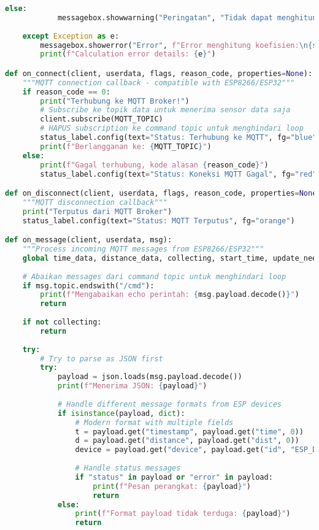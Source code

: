 \begin{itemize}
\begin{scriptsize}
\begin{lstlisting}[language=python]
        else:
            messagebox.showwarning("Peringatan", "Tidak dapat menghitung koefisien\nTidak ditemukan pasangan pantulan yang valid")
            
    except Exception as e:
        messagebox.showerror("Error", f"Error menghitung koefisien:\n{str(e)}\n\nSilakan periksa data dan pengaturan Anda")
        print(f"Calculation error details: {e}")

def on_connect(client, userdata, flags, reason_code, properties=None):
    """MQTT connection callback - compatible with ESP8266/ESP32"""
    if reason_code == 0:
        print("Terhubung ke MQTT Broker!")
        # Subscribe ke topik data untuk menerima sensor data saja
        client.subscribe(MQTT_TOPIC)
        # HAPUS subscription ke command topic untuk menghindari loop
        status_label.config(text="Status: Terhubung ke MQTT", fg="blue")
        print(f"Berlangganan ke: {MQTT_TOPIC}")
    else:
        print(f"Gagal terhubung, kode alasan {reason_code}")
        status_label.config(text="Status: Koneksi MQTT Gagal", fg="red")

def on_disconnect(client, userdata, flags, reason_code, properties=None):
    """MQTT disconnection callback"""
    print("Terputus dari MQTT Broker")
    status_label.config(text="Status: MQTT Terputus", fg="orange")

def on_message(client, userdata, msg):
    """Process incoming MQTT messages from ESP8266/ESP32"""
    global time_data, distance_data, collecting, start_time, update_needed, sensor_height
    
    # Abaikan messages dari command topic untuk menghindari loop
    if msg.topic.endswith("/cmd"):
        print(f"Mengabaikan echo perintah: {msg.payload.decode()}")
        return
    
    if not collecting:
        return
        
    try:
        # Try to parse as JSON first
        try:
            payload = json.loads(msg.payload.decode())
            print(f"Menerima JSON: {payload}")
            
            # Handle different message formats from ESP devices
            if isinstance(payload, dict):
                # Modern format with multiple fields
                t = payload.get("timestamp", payload.get("time", 0))
                d = payload.get("distance", payload.get("dist", 0))
                device = payload.get("device", payload.get("id", "ESP_Device"))
                
                # Handle status messages
                if "status" in payload or "error" in payload:
                    print(f"Pesan perangkat: {payload}")
                    return
            else:
                print(f"Format payload tidak terduga: {payload}")
                return
                

\end{lstlisting}
\end{scriptsize}
\end{itemize}
